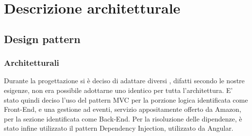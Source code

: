 \documentclass[../DefinizioneDiProdotto.tex]{subfiles}
\begin{document}
\section{Descrizione architetturale}

	\subsection{Design pattern}

		\subsubsection{Architetturali}
		Durante la progettazione si è deciso di adattare diversi , difatti secondo le nostre esigenze, non era possibile adottarne uno identico per tutta l'architettura.
		E' stato quindi deciso l'uso del pattern MVC per la porzione logica identificata come Front-End, e una gestione ad eventi, servizio appositamente offerto da Amazon, per la sezione identificata come Back-End.
		Per la risoluzione delle dipendenze, è stato infine utilizzato il pattern Dependency Injection, utilizzato da Angular.
\end{document}

